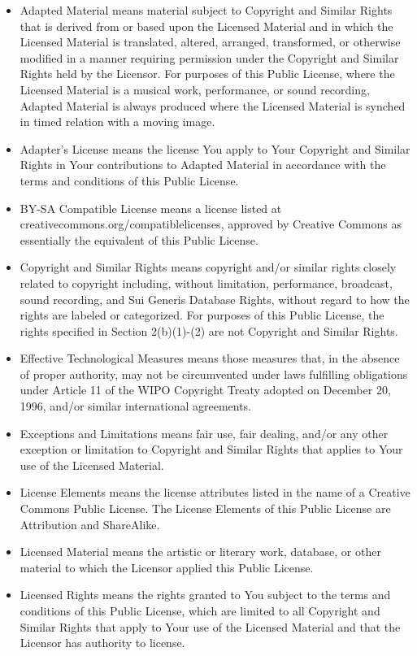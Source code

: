     
\begin{itemize}
\item Adapted Material means material subject to Copyright and Similar Rights that is derived from or based upon the Licensed Material and in which the Licensed Material is translated, altered, arranged, transformed, or otherwise modified in a manner requiring permission under the Copyright and Similar Rights held by the Licensor. For purposes of this Public License, where the Licensed Material is a musical work, performance, or sound recording, Adapted Material is always produced where the Licensed Material is synched in timed relation with a moving image.
\item Adapter's License means the license You apply to Your Copyright and Similar Rights in Your contributions to Adapted Material in accordance with the terms and conditions of this Public License.
\item BY-SA Compatible License means a license listed at creativecommons.org/compatiblelicenses, approved by Creative Commons as essentially the equivalent of this Public License.
\item Copyright and Similar Rights means copyright and/or similar rights closely related to copyright including, without limitation, performance, broadcast, sound recording, and Sui Generis Database Rights, without regard to how the rights are labeled or categorized. For purposes of this Public License, the rights specified in Section 2(b)(1)-(2) are not Copyright and Similar Rights.
\item Effective Technological Measures means those measures that, in the absence of proper authority, may not be circumvented under laws fulfilling obligations under Article 11 of the WIPO Copyright Treaty adopted on December 20, 1996, and/or similar international agreements.
\item Exceptions and Limitations means fair use, fair dealing, and/or any other exception or limitation to Copyright and Similar Rights that applies to Your use of the Licensed Material.
\item License Elements means the license attributes listed in the name of a Creative Commons Public License. The License Elements of this Public License are Attribution and ShareAlike.
\item Licensed Material means the artistic or literary work, database, or other material to which the Licensor applied this Public License.
\item Licensed Rights means the rights granted to You subject to the terms and conditions of this Public License, which are limited to all Copyright and Similar Rights that apply to Your use of the Licensed Material and that the Licensor has authority to license.

\end{itemize}
